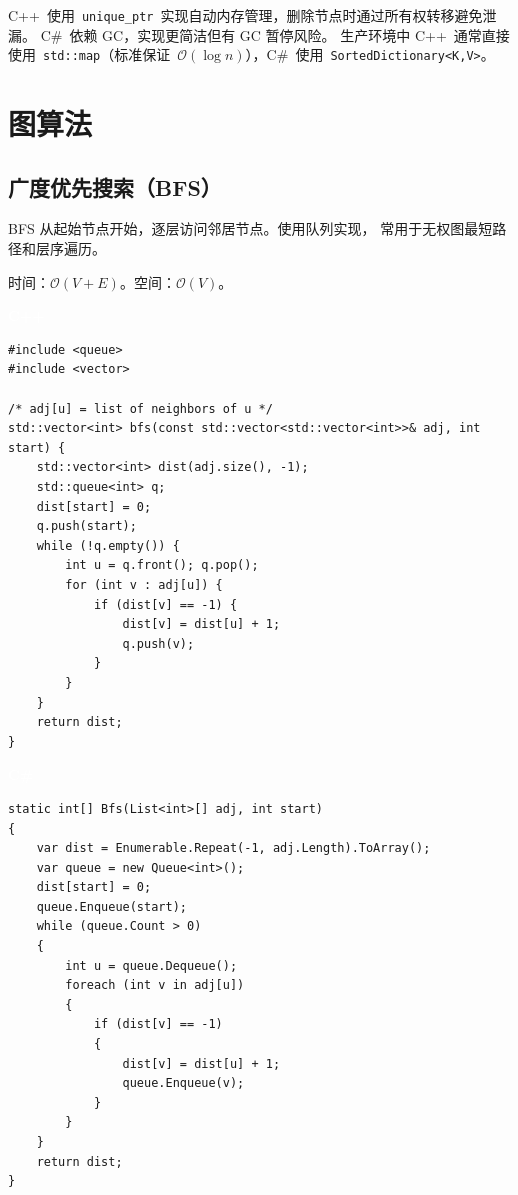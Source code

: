 \documentclass[12pt,a4paper,fontset=fandol]{ctexbook}
\newcommand{\cpplabel}{%
  \noindent\begin{tcolorbox}[sharp corners,colback=cppheadbg,colframe=cppheadbg,
    left=6pt,right=6pt,top=2pt,bottom=2pt,boxrule=0pt]
  \textcolor{white}{\small\bfseries\sffamily C++}\end{tcolorbox}%
}
\newcommand{\csharplabel}{%
  \noindent\begin{tcolorbox}[sharp corners,colback=csharpheadbg,colframe=csharpheadbg,
    left=6pt,right=6pt,top=2pt,bottom=2pt,boxrule=0pt]
  \textcolor{white}{\small\bfseries\sffamily C\#}\end{tcolorbox}%
}
\newcommand{\bigO}[1]{\mathcal{O}(#1)}
\newcommand{\Tp}[1]{\texttt{#1}}
\begin{document}
\begin{compare}
C++~使用~\Tp{unique\_ptr}~实现自动内存管理，删除节点时通过所有权转移避免泄漏。
C\#~依赖 GC，实现更简洁但有 GC 暂停风险。
生产环境中 C++~通常直接使用~\Tp{std::map}（标准保证~$\bigO{\log n}$），C\#~使用~\Tp{SortedDictionary<K,V>}。
\end{compare}

\part{图算法}

\chapter{广度优先搜索（BFS）}

BFS 从起始节点开始，逐层访问邻居节点。使用队列实现，
常用于无权图最短路径和层序遍历。

\begin{complexitybox}
  时间：$\bigO{V + E}$。空间：$\bigO{V}$。
\end{complexitybox}

\cpplabel
\begin{lstlisting}[style=cppstyle]
#include <queue>
#include <vector>

/* adj[u] = list of neighbors of u */
std::vector<int> bfs(const std::vector<std::vector<int>>& adj, int start) {
    std::vector<int> dist(adj.size(), -1);
    std::queue<int> q;
    dist[start] = 0;
    q.push(start);
    while (!q.empty()) {
        int u = q.front(); q.pop();
        for (int v : adj[u]) {
            if (dist[v] == -1) {
                dist[v] = dist[u] + 1;
                q.push(v);
            }
        }
    }
    return dist;
}
\end{lstlisting}

\csharplabel
\begin{lstlisting}[style=csharpstyle]
static int[] Bfs(List<int>[] adj, int start)
{
    var dist = Enumerable.Repeat(-1, adj.Length).ToArray();
    var queue = new Queue<int>();
    dist[start] = 0;
    queue.Enqueue(start);
    while (queue.Count > 0)
    {
        int u = queue.Dequeue();
        foreach (int v in adj[u])
        {
            if (dist[v] == -1)
            {
                dist[v] = dist[u] + 1;
                queue.Enqueue(v);
            }
        }
    }
    return dist;
}
\end{lstlisting}
\end{document}
